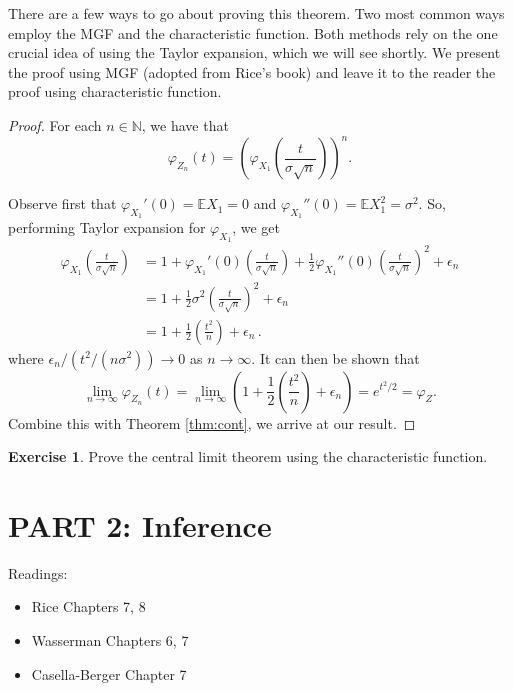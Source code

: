\documentclass[
  openany]{book}
\providecommand{\tightlist}{%
  \setlength{\itemsep}{0pt}\setlength{\parskip}{0pt}}
\theoremstyle{definition}
\theoremstyle{definition}
\theoremstyle{definition}
\newtheorem{exercise}{Exercise}[chapter]
\theoremstyle{definition}
\theoremstyle{remark}
\begin{document}
There are a few ways to go about proving this theorem.
Two most common ways employ the MGF and the characteristic function.
Both methods rely on the one crucial idea of using the Taylor expansion,
which we will see shortly.
We present the proof using MGF (adopted from Rice's book) and leave it to the reader the proof using characteristic function.

\begin{proof}
For each \(n \in \mathbb{N}\), we have that
\[ \varphi_{Z_n} (t) = \left( \varphi_{X_1} \left( \frac{t}{\sigma \sqrt{n}} \right) \right)^n. \]

Observe first that
\(\varphi_{X_1}'(0) = \mathbb{E}X_1 = 0\) and \(\varphi_{X_1}''(0) = \mathbb{E}X_1^2 = \sigma^2\).
So, performing Taylor expansion for \(\varphi_{X_1}\), we get
\[
\begin{aligned}
\varphi_{X_1} \left( \frac{t}{\sigma \sqrt{n}} \right)  
        &=  1 + \varphi_{X_1}'(0) \left( \frac{t}{\sigma \sqrt{n}} \right) 
           + \frac{1}{2} \varphi_{X_1}''(0) \left( \frac{t}{\sigma \sqrt{n}} \right)^2 + \epsilon_n  \\
        & = 1 + \frac{1}{2} \sigma^2 \left( \frac{t}{\sigma \sqrt{n}} \right)^2 + \epsilon_n \\
        & = 1 + \frac{1}{2} \left( \frac{t^2}{n} \right) + \epsilon_n \,.
\end{aligned}\]
where \(\epsilon_n / (t^2 / (n\sigma^2)) \to 0\) as \(n \to \infty\).
It can then be shown that
\[ \lim_{n\to \infty} \varphi_{Z_n}(t) = \lim_{n\to \infty} \left( 1 + \frac{1}{2} \left( \frac{t^2}{n} \right) + \epsilon_n  \right) = e^{t^2/2} = \varphi_Z .\]
Combine this with Theorem \ref{thm:cont}, we arrive at our result.
\end{proof}

\begin{exercise}
Prove the central limit theorem using the characteristic function.
\end{exercise}

\chapter*{PART 2: Inference}\label{part-2-inference}


Readings:

\begin{itemize}
\tightlist
\item
  Rice Chapters 7, 8
\item
  Wasserman Chapters 6, 7
\item
  Casella-Berger Chapter 7
\end{itemize}
\end{document}
